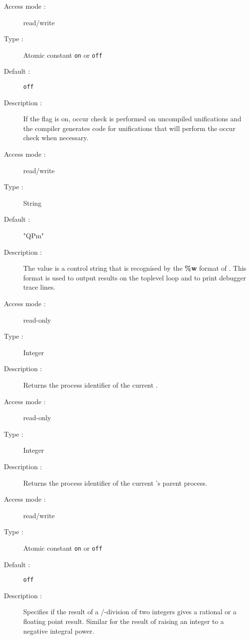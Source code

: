 \begin{description}
\begin{description}
\item[Access mode :] read/write
\item[Type : ] Atomic constant {\tt on} or {\tt off} 
\item[Default : ] {\tt off}
\item[Description :] If the flag is on, occur check is performed
on uncompiled unifications and the compiler generates code for unifications
that will perform the occur check when necessary.
\end{description}

\begin{description}
\item[Access mode :] read/write
\item[Type :] String
\item[Default : ] "QPm"
\item[Description :] The value is a control string that is recognised
by the {\bf \%w} format of .
This format is used to output results on the toplevel loop and to print
debugger trace lines.
\end{description}

\begin{description}
\item[Access mode : ] read-only
\item[Type : ] Integer 
\item[Description : ] Returns the process identifier of the current {\eclipse}.
\end{description}

\pagebreak[3]
\begin{description}
\item[Access mode : ] read-only
\item[Type : ] Integer 
\item[Description : ] Returns the process identifier of the current {\eclipse}'s
parent process.
\end{description}

\begin{description}
\item[Access mode : ] read/write
\item[Type : ] Atomic constant {\tt on} or {\tt off}
\item[Default : ] {\tt off}
\item[Description : ] Specifies if the result of a /-division of two integers
gives a rational or a floating point result.
Similar for the result of raising an integer to a negative integral power.
\end{description}


\end{description}
